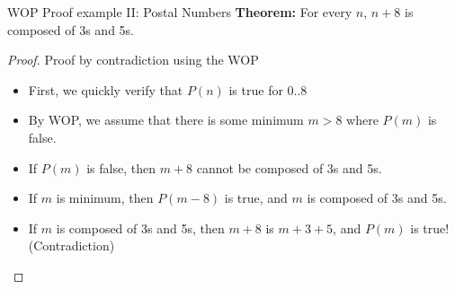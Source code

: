 \begin{frame}{WOP Proof example II: Postal Numbers}
  {\bf Theorem:} For every $n$, $n+8$ is composed of 3s and 5s.

  \begin{proof}
    Proof by contradiction using the WOP
    \begin{itemize}
      \item First, we quickly verify that $P(n)$ is true for 0..8
      \item By WOP, we assume that there is some minimum $m > 8$ where $P(m)$ is false.
      \item If $P(m)$ is false, then $m+8$ cannot be composed of 3s and 5s.
      \item If $m$ is minimum, then $P(m-8)$ is true, and $m$ is composed of 3s and 5s.
      \item If $m$ is composed of 3s and 5s, then $m+8$ is $m+3+5$, and $P(m)$ is true! (\alert{Contradiction})
    \end{itemize}
  \end{proof}
\end{frame}
